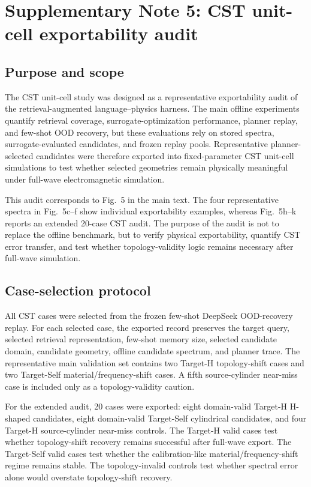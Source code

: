 \documentclass[final,1p,times]{elsarticle}
\begin{document}
\section{Supplementary Note 5: CST unit-cell exportability audit}

\subsection{Purpose and scope}

The CST unit-cell study was designed as a representative exportability audit of the retrieval-augmented language--physics harness. The main offline experiments quantify retrieval coverage, surrogate-optimization performance, planner replay, and few-shot OOD recovery, but these evaluations rely on stored spectra, surrogate-evaluated candidates, and frozen replay pools. Representative planner-selected candidates were therefore exported into fixed-parameter CST unit-cell simulations to test whether selected geometries remain physically meaningful under full-wave electromagnetic simulation.

This audit corresponds to Fig.~5 in the main text. The four representative spectra in Fig.~5c--f show individual exportability examples, whereas Fig.~5h--k reports an extended 20-case CST audit. The purpose of the audit is not to replace the offline benchmark, but to verify physical exportability, quantify CST error transfer, and test whether topology-validity logic remains necessary after full-wave simulation.

\subsection{Case-selection protocol}

All CST cases were selected from the frozen few-shot DeepSeek OOD-recovery replay. For each selected case, the exported record preserves the target query, selected retrieval representation, few-shot memory size, selected candidate domain, candidate geometry, offline candidate spectrum, and planner trace. The representative main validation set contains two Target-H topology-shift cases and two Target-Self material/frequency-shift cases. A fifth source-cylinder near-miss case is included only as a topology-validity caution.

For the extended audit, 20 cases were exported: eight domain-valid Target-H H-shaped candidates, eight domain-valid Target-Self cylindrical candidates, and four Target-H source-cylinder near-miss controls. The Target-H valid cases test whether topology-shift recovery remains successful after full-wave export. The Target-Self valid cases test whether the calibration-like material/frequency-shift regime remains stable. The topology-invalid controls test whether spectral error alone would overstate topology-shift recovery.
\end{document}
